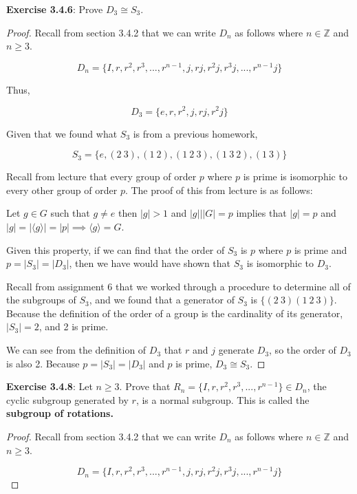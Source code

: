 \documentclass[a4paper]{article}
\begin{document}
\begin{myparindent}{0pt}
\textbf{Exercise 3.4.6}:
Prove $D_3 \cong S_3$.
\begin{proof}
  Recall from section 3.4.2 that we can write $D_n$ as follows where
  $n \in \mathbb{Z}$ and $n \ge 3$.

  \[ D_n = \{I, r, r^2, r^3,..., r^{n-1},j,rj, r^2 j, r^3 j,..., r^{n-1} j \} \]

  Thus,

  \[ D_3 = \{ e, r, r^2, j, rj, r^2j \} \]

  Given that we found what $S_3$ is from a previous homework,

  \[ S_3 = \{ e, (2 ~3), (1 ~2), (1 ~2 ~3), (1 ~3 ~2), (1 ~3) \} \]

  Recall from lecture that every group of order $p$ where $p$ is prime is
  isomorphic to every other group of order $p$. The proof of this from lecture
  is as follows:

  Let $g \in G$ such that $g \neq e$ then $|g| > 1$ and $|g| \vert |G| = p$
  implies that $|g| = p$ and $|g| = |\langle g \rangle| = |p| \implies \langle g \rangle = G$. \newline

  Given this property, if we can find that the order of $S_3$ is $p$ where $p$
  is prime and $p = |S_3| = |D_3|$, then we have would have shown that $S_3$ is
  isomorphic to $D_3$. \newline

  Recall from assignment 6 that we worked through a
  procedure to determine all of the subgroups of $S_3$, and we found that a
  generator of $S_3$ is $\{ (2 ~3) (1 ~2 ~3)\}$. Because the definition of the
  order of a group is the cardinality of its generator, $|S_3| = 2$, and 2 is
  prime.
  \newline

  We can see from the definition of $D_3$ that $r$ and $j$ generate $D_3$, so
  the order of $D_3$ is also 2. Because $p = |S_3| = |D_3|$ and $p$ is prime,
  $D_3 \cong S_3$.

\end{proof}

\textbf{Exercise 3.4.8}:
Let $n \ge 3$. Prove that $R_n = \{ I, r, r^2, r^3, ..., r^{n - 1} \} \in D_n$,
the cyclic subgroup generated by $r$, is a normal subgroup. This is called the
\textbf{subgroup of rotations.}
\begin{proof}
  Recall from section 3.4.2 that we can write $D_n$ as follows where
  $n \in \mathbb{Z}$ and $n \ge 3$.

  \[ D_n = \{I, r, r^2, r^3,..., r^{n-1},j,rj, r^2 j, r^3 j,..., r^{n-1} j \} \]


\end{proof}
\end{myparindent}
\end{document}
